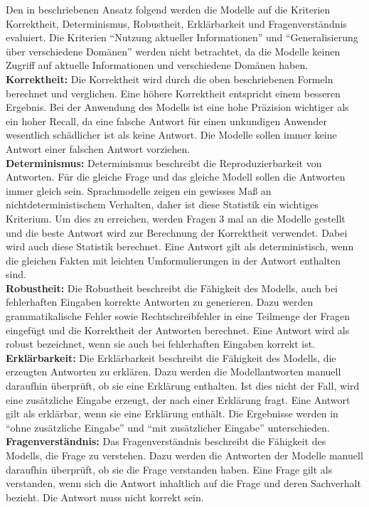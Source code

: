Den in \citet{chatgpt_qas} beschriebenen Ansatz folgend werden die Modelle auf die Kriterien Korrektheit, Determinismus, Robustheit, Erklärbarkeit und Fragenverständnis evaluiert.
Die Kriterien \enquote{Nutzung aktueller Informationen} und \enquote{Generalisierung über verschiedene Domänen} werden nicht betrachtet, da die Modelle keinen Zugriff auf aktuelle Informationen und verschiedene Domänen haben.\\

\noindent\textbf{Korrektheit:}\newline
Die Korrektheit wird durch die oben beschriebenen Formeln berechnet und verglichen.
Eine höhere Korrektheit entspricht einem besseren Ergebnis.
Bei der Anwendung des Modells ist eine hohe Präzision wichtiger als ein hoher Recall, da eine falsche Antwort für einen unkundigen Anwender wesentlich schädlicher ist als keine Antwort.
Die Modelle sollen immer keine Antwort einer falschen Antwort vorziehen.\\

\noindent\textbf{Determinismus:}\newline
Determinismus beschreibt die Reproduzierbarkeit von Antworten.
Für die gleiche Frage und das gleiche Modell sollen die Antworten immer gleich sein.
Sprachmodelle zeigen ein gewisses Maß an nichtdeterministischem Verhalten, daher ist diese Statistik ein wichtiges Kriterium.
Um dies zu erreichen, werden Fragen 3 mal an die Modelle gestellt und die beste Antwort wird zur Berechnung der Korrektheit verwendet.
Dabei wird auch diese Statistik berechnet.
Eine Antwort gilt als deterministisch, wenn die gleichen Fakten mit leichten Umformulierungen in der Antwort enthalten sind.\\

\noindent\textbf{Robustheit:}\newline
Die Robustheit beschreibt die Fähigkeit des Modells, auch bei fehlerhaften Eingaben korrekte Antworten zu generieren.
Dazu werden grammatikalische Fehler sowie Rechtschreibfehler in eine Teilmenge der Fragen eingefügt und die Korrektheit der Antworten berechnet.
Eine Antwort wird als robust bezeichnet, wenn sie auch bei fehlerhaften Eingaben korrekt ist.\\

\noindent\textbf{Erklärbarkeit:}\newline
Die Erklärbarkeit beschreibt die Fähigkeit des Modells, die erzeugten Antworten zu erklären.
Dazu werden die Modellantworten manuell daraufhin überprüft, ob sie eine Erklärung enthalten.
Ist dies nicht der Fall, wird eine zusätzliche Eingabe erzeugt, der nach einer Erklärung fragt.
Eine Antwort gilt als erklärbar, wenn sie eine Erklärung enthält.
Die Ergebnisse werden in \enquote{ohne zusätzliche Eingabe} und \enquote{mit zusätzlicher Eingabe} unterschieden.\\

\noindent\textbf{Fragenverständnis:}\newline
Das Fragenverständnis beschreibt die Fähigkeit des Modells, die Frage zu verstehen.
Dazu werden die Antworten der Modelle manuell daraufhin überprüft, ob sie die Frage verstanden haben. Eine Frage gilt als verstanden, wenn sich die Antwort inhaltlich auf die Frage und deren Sachverhalt bezieht. Die Antwort muss nicht korrekt sein.
